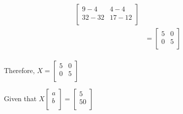 \documentclass[journal, 11pt,twocolumn]{IEEEtran}
\begin{document}
\begin{align}
\begin{bmatrix}
    9 - 4 & 4 - 4\\
    32 - 32 & 17 - 12\\
    \end{bmatrix}\nonumber\\
    & = \begin{bmatrix}
    5 & 0\\
    0 & 5\\
    \end{bmatrix}\nonumber
    \end{align}\\ Therefore, $X = \begin{bmatrix}
    5 & 0\\
    0 & 5\\
    \end{bmatrix}$
    
 Given that $X\begin{bmatrix}
    a\\
    b\\
    \end{bmatrix}=\begin{bmatrix}
    5\\
    50\\
    \end{bmatrix}$
\end{document}
